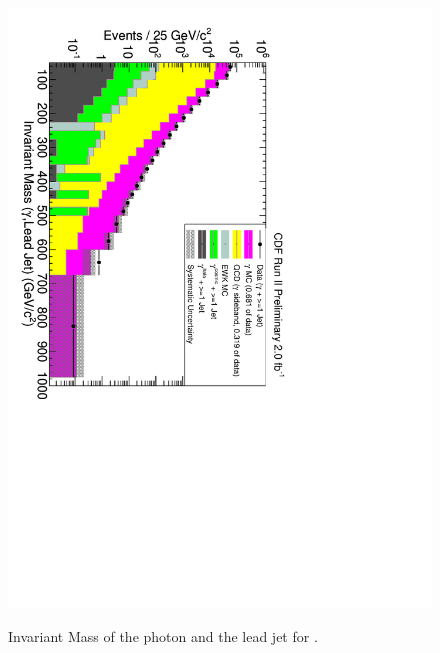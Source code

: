\documentclass[11pt]{article}
\begin{document}
\begin{figure}
\begin{centering}
 {
\includegraphics[scale=0.7]{plot1_InvMass.pdf} }
\caption{Invariant Mass of the photon and the lead jet for \phoonejet.}
\label{fig-p1jInvMass}
\end{centering}
\end{figure}
\end{document}
